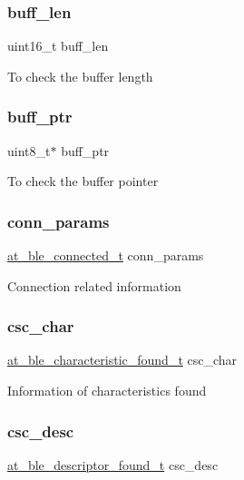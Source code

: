 \subsubsection{\texorpdfstring{buff\_len}{buff\_len}}
{\footnotesize\ttfamily uint16\+\_\+t buff\+\_\+len}

To check the buffer length \mbox{\label{structapp__csc__data_af34165e5e67e8fa1a840bcbe1e2bff0f}} 
\subsubsection{\texorpdfstring{buff\_ptr}{buff\_ptr}}
{\footnotesize\ttfamily uint8\+\_\+t$\ast$ buff\+\_\+ptr}

To check the buffer pointer \mbox{\label{structapp__csc__data_aa63ebe8c9ed55c19dbcfc3ea5c572e27}} 
\subsubsection{\texorpdfstring{conn\_params}{conn\_params}}
{\footnotesize\ttfamily \mbox{\hyperlink{structat__ble__connected__t}{at\+\_\+ble\+\_\+connected\+\_\+t}} conn\+\_\+params}

Connection related information \mbox{\label{structapp__csc__data_a9f076867f147ef3d4d36e80d808e6ae3}} 
\subsubsection{\texorpdfstring{csc\_char}{csc\_char}}
{\footnotesize\ttfamily \mbox{\hyperlink{structat__ble__characteristic__found__t}{at\+\_\+ble\+\_\+characteristic\+\_\+found\+\_\+t}} csc\+\_\+char}

Information of characteristics found \mbox{\label{structapp__csc__data_ad7d9b912938d426e90e5054b4daace93}} 
\subsubsection{\texorpdfstring{csc\_desc}{csc\_desc}}
{\footnotesize\ttfamily \mbox{\hyperlink{structat__ble__descriptor__found__t}{at\+\_\+ble\+\_\+descriptor\+\_\+found\+\_\+t}} csc\+\_\+desc}

